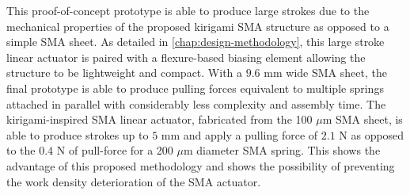 This proof-of-concept prototype is able to produce large strokes due to the mechanical properties of the proposed kirigami SMA structure as opposed to a simple SMA sheet. As detailed in \cref{chap:design-methodology}, this large stroke linear actuator is paired with a flexure-based biasing element allowing the structure to be lightweight and compact. With a $9.6$ mm wide SMA sheet, the final prototype is able to produce pulling forces equivalent to multiple springs attached in parallel with considerably less complexity and assembly time. The kirigami-inspired SMA linear actuator, fabricated from the 100 $\mu$m SMA sheet, is able to produce strokes up to $5$ mm and apply a pulling force of $2.1$ N as opposed to the $0.4$ N of pull-force for a 200 $\mu$m diameter SMA spring. This shows the advantage of this proposed methodology and shows the possibility of preventing the work density deterioration of the SMA actuator.
